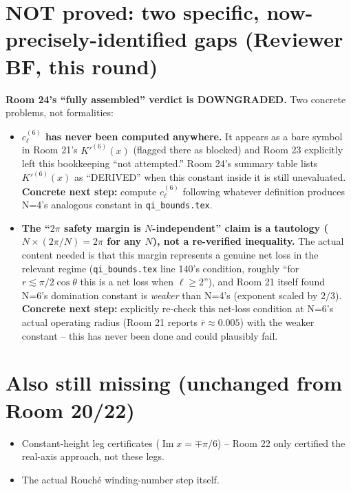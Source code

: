 \documentclass[11pt]{article}
\begin{document}
\section*{NOT proved: two specific, now-precisely-identified gaps (Reviewer BF, this round)}
\textbf{Room 24's ``fully assembled'' verdict is DOWNGRADED.} Two concrete problems, not
formalities:
\begin{itemize}
\item \textbf{$c_\ell^{(6)}$ has never been computed anywhere.} It appears as a bare symbol in
Room 21's $K'^{(6)}(x)$ (flagged there as blocked) and Room 23 explicitly left this bookkeeping
``not attempted.'' Room 24's summary table lists $K'^{(6)}(x)$ as ``DERIVED'' when this constant
inside it is still unevaluated. \textbf{Concrete next step:} compute $c_\ell^{(6)}$ following
whatever definition produces N=4's analogous constant in \texttt{qi\_bounds.tex}.
\item \textbf{The ``$2\pi$ safety margin is $N$-independent'' claim is a tautology
($N\times(2\pi/N)=2\pi$ for any $N$), not a re-verified inequality.} The actual content needed is
that this margin represents a genuine net loss in the relevant regime (\texttt{qi\_bounds.tex}
line 140's condition, roughly ``for $r\lesssim\pi/2\cos\theta$ this is a net loss when
$\ell\ge2$''), and Room 21 itself found N=6's domination constant is \emph{weaker} than N=4's
(exponent scaled by $2/3$). \textbf{Concrete next step:} explicitly re-check this net-loss
condition at N=6's actual operating radius (Room 21 reports $\bar r\approx0.005$) with the weaker
constant -- this has never been done and could plausibly fail.
\end{itemize}

\section*{Also still missing (unchanged from Room 20/22)}
\begin{itemize}
\item Constant-height leg certificates ($\operatorname{Im}x=\mp\pi/6$) -- Room 22 only certified
the real-axis approach, not these legs.
\item The actual Rouch\'e winding-number step itself.
\end{itemize}
\end{document}
